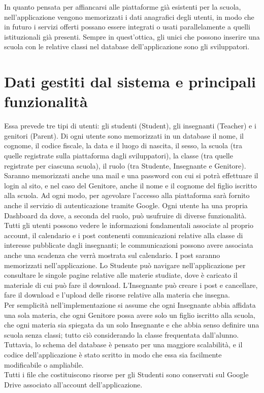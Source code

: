 \documentclass[Lau, binding=0.6cm, oneside]{sapthesis}
\begin{document}
In quanto pensata per affiancarsi alle piattaforme già esistenti per la scuola, nell'applicazione vengono memorizzati i dati anagrafici degli utenti, in modo che in futuro i servizi offerti possano essere integrati o usati parallelamente a quelli istituzionali già presenti. Sempre in quest'ottica, gli unici che possono inserire una scuola con le relative classi nel database dell'applicazione sono gli sviluppatori.\\

\section{Dati gestiti dal sistema e principali funzionalità} \label{requisiti_db}

Essa prevede tre tipi di utenti: gli studenti (Student), gli insegnanti (Teacher) e i genitori (Parent). Di ogni utente sono memorizzati in un database il nome, il cognome, il codice fiscale, la data e il luogo di nascita, il sesso, la scuola (tra quelle registrate sulla piattaforma dagli sviluppatori), la classe (tra quelle registrate per ciascuna scuola), il ruolo (tra Studente, Insegnante e Genitore). Saranno memorizzati anche una mail e una password con cui si potrà effettuare il login al sito, e nel caso del Genitore, anche il nome e il cognome del figlio iscritto alla scuola. Ad ogni modo, per agevolare l’accesso alla piattaforma sarà fornito anche il servizio di autenticazione tramite Google. Ogni utente ha una propria Dashboard da dove, a seconda del ruolo, può usufruire di diverse funzionalità. Tutti gli utenti possono vedere le informazioni fondamentali associate al proprio account, il calendario e i post contenenti comunicazioni relative alla classe di interesse pubblicate dagli insegnanti; le communicazioni possono avere associata anche una scadenza che verrà mostrata sul calendario. I post saranno memorizzati nell’applicazione. Lo Studente può navigare nell’applicazione per consultare le singole pagine relative alle materie studiate, dove è caricato il materiale di cui può fare il download. L’Insegnante può creare i post e cancellare, fare il download e l’upload delle risorse relative alla materia che insegna.\\
Per semplicità nell’implementazione si assume che ogni Insegnante abbia affidata una sola materia, che ogni Genitore possa avere solo un figlio iscritto alla scuola, che ogni materia sia spiegata da un solo Insegnante e che abbia senso definire una scuola senza classi; tutto ciò considerando la classe frequentata dall’alunno. Tuttavia, lo schema del database è pensato per una maggiore scalabilità, e il codice dell'applicazione è stato scritto in modo che essa sia facilmente modificabile o ampliabile. \\
Tutti i file che costituiscono risorse per gli Studenti sono conservati sul Google Drive associato all’account dell’applicazione.\\
\end{document}
